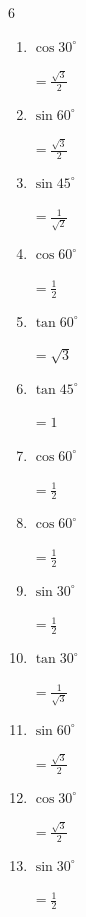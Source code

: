 \begin{multicols}{6}
\begin{enumerate}
  \item $\displaystyle \cos{30^\circ}$

        $\displaystyle =\frac{\sqrt{3}}{2}$

  \item $\displaystyle \sin{60^\circ}$

        $\displaystyle =\frac{\sqrt{3}}{2}$

  \item $\displaystyle \sin{45^\circ}$

        $\displaystyle =\frac{1}{\sqrt{2}}$

  \item $\displaystyle \cos{60^\circ}$

        $\displaystyle =\frac{1}{2}$

  \item $\displaystyle \tan{60^\circ}$

        $\displaystyle =\sqrt{3}$

  \item $\displaystyle \tan{45^\circ}$

        $\displaystyle =1$

  \item $\displaystyle \cos{60^\circ}$

        $\displaystyle =\frac{1}{2}$

  \item $\displaystyle \cos{60^\circ}$

        $\displaystyle =\frac{1}{2}$

  \item $\displaystyle \sin{30^\circ}$

        $\displaystyle =\frac{1}{2}$

  \item $\displaystyle \tan{30^\circ}$

        $\displaystyle =\frac{1}{\sqrt{3}}$

  \item $\displaystyle \sin{60^\circ}$

        $\displaystyle =\frac{\sqrt{3}}{2}$

  \item $\displaystyle \cos{30^\circ}$

        $\displaystyle =\frac{\sqrt{3}}{2}$

  \item $\displaystyle \sin{30^\circ}$

        $\displaystyle =\frac{1}{2}$


\end{enumerate}
\end{multicols}
